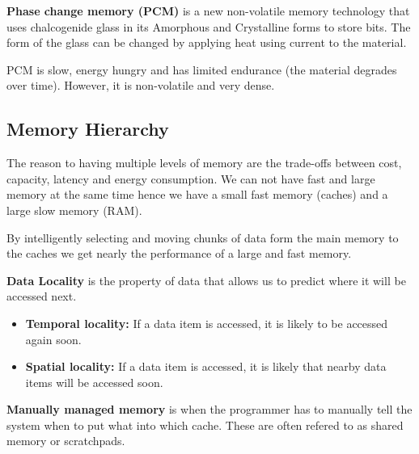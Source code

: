\begin{definition}
	\textbf{Phase change memory (PCM)} is a new non-volatile memory technology that uses chalcogenide glass in its Amorphous and Crystalline forms to store bits. The form of the glass can be changed by applying heat using current to the material.
\end{definition}

\begin{remark}
	PCM is slow, energy hungry and has limited endurance (the material degrades over time). However, it is non-volatile and very dense.
\end{remark}

\subsection{Memory Hierarchy}

\begin{remark}
	The reason to having multiple levels of memory are the trade-offs between cost, capacity, latency and energy consumption. We can not have fast and large memory at the same time hence we have a small fast memory (caches) and a large slow memory (RAM).
\end{remark}

\begin{remark}
	By intelligently selecting and moving chunks of data form the main memory to the caches we get nearly the performance of a large and fast memory.
\end{remark}

\begin{definition}
	\textbf{Data Locality} is the property of data that allows us to predict where it will be accessed next.
	\begin{itemize}
		\item \textbf{Temporal locality:} If a data item is accessed, it is likely to be accessed again soon.
		\item \textbf{Spatial locality:} If a data item is accessed, it is likely that nearby data items will be accessed soon.
	\end{itemize}
\end{definition}

\begin{definition}
	\textbf{Manually managed memory} is when the programmer has to manually tell the system when to put what into which cache. These are often refered to as shared memory or scratchpads.
\end{definition}

